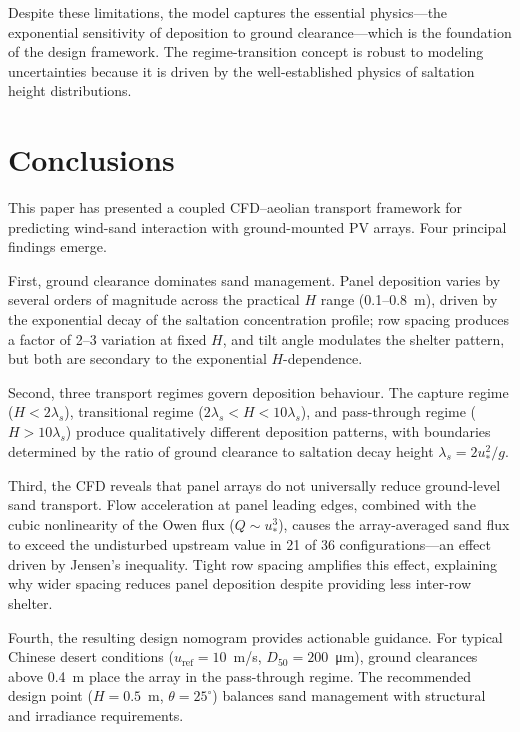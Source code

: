 \documentclass[preprint,12pt,review]{elsarticle}
\begin{document}
Despite these limitations, the model captures the essential physics---the exponential sensitivity of deposition to ground clearance---which is the foundation of the design framework. The regime-transition concept is robust to modeling uncertainties because it is driven by the well-established physics of saltation height distributions.

\section{Conclusions}
\label{sec:conclusions}

This paper has presented a coupled CFD--aeolian transport framework for predicting wind-sand interaction with ground-mounted PV arrays. Four principal findings emerge.

First, ground clearance dominates sand management. Panel deposition varies by several orders of magnitude across the practical $H$ range (0.1--0.8~m), driven by the exponential decay of the saltation concentration profile; row spacing produces a factor of 2--3 variation at fixed $H$, and tilt angle modulates the shelter pattern, but both are secondary to the exponential $H$-dependence.

Second, three transport regimes govern deposition behaviour. The capture regime ($H < 2\lambda_s$), transitional regime ($2\lambda_s < H < 10\lambda_s$), and pass-through regime ($H > 10\lambda_s$) produce qualitatively different deposition patterns, with boundaries determined by the ratio of ground clearance to saltation decay height $\lambda_s = 2u_*^2/g$.

Third, the CFD reveals that panel arrays do not universally reduce ground-level sand transport. Flow acceleration at panel leading edges, combined with the cubic nonlinearity of the Owen flux ($Q \sim u_*^3$), causes the array-averaged sand flux to exceed the undisturbed upstream value in 21 of 36 configurations---an effect driven by Jensen's inequality. Tight row spacing amplifies this effect, explaining why wider spacing reduces panel deposition despite providing less inter-row shelter.

Fourth, the resulting design nomogram provides actionable guidance. For typical Chinese desert conditions ($u_\text{ref} = 10$~m/s, $D_{50} = 200$~\si{\micro\metre}), ground clearances above 0.4~m place the array in the pass-through regime. The recommended design point ($H = 0.5$~m, $\theta = 25^\circ$) balances sand management with structural and irradiance requirements.
\end{document}
